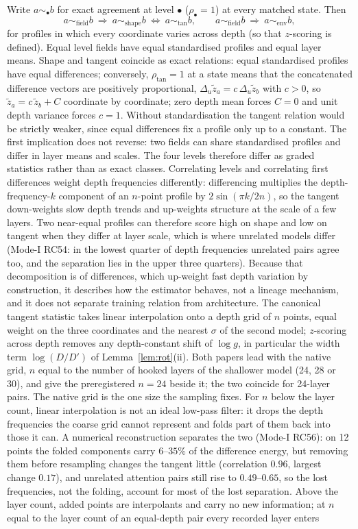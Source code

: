 \documentclass[11pt]{article}
\theoremstyle{definition}
\begin{document}
Write $a\sim_\bullet b$ for exact agreement at level $\bullet$ ($\rho_\bullet=1$) at every matched state. Then
\[
 a\sim_{\mathrm{field}} b\ \Rightarrow\ a\sim_{\mathrm{shape}} b\ \Longleftrightarrow\ a\sim_{\mathrm{tan}}b,\qquad a\sim_{\mathrm{field}}b\ \Rightarrow\ a\sim_{\mathrm{env}}b,
\]
for profiles in which every coordinate varies across depth (so that $z$-scoring is defined). Equal level fields have equal standardised profiles and equal layer means. Shape and tangent coincide as exact relations: equal standardised profiles have equal differences; conversely, $\rho_{\mathrm{tan}}=1$ at a state means that the concatenated difference vectors are positively proportional, $\Delta_u\tilde z_a=c\,\Delta_u\tilde z_b$ with $c>0$, so $\tilde z_a=c\,\tilde z_b+C$ coordinate by coordinate; zero depth mean forces $C=0$ and unit depth variance forces $c=1$. Without standardisation the tangent relation would be strictly weaker, since equal differences fix a profile only up to a constant. The first implication does not reverse: two fields can share standardised profiles and differ in layer means and scales. The four levels therefore differ as graded statistics rather than as exact classes. Correlating levels and correlating first differences weight depth frequencies differently: differencing multiplies the depth-frequency-$k$ component of an $n$-point profile by $2\sin(\pi k/2n)$, so the tangent down-weights slow depth trends and up-weights structure at the scale of a few layers. Two near-equal profiles can therefore score high on shape and low on tangent when they differ at layer scale, which is where unrelated models differ (Mode-I RC54: in the lowest quarter of depth frequencies unrelated pairs agree too, and the separation lies in the upper three quarters). Because that decomposition is of differences, which up-weight fast depth variation by construction, it describes how the estimator behaves, not a lineage mechanism, and it does not separate training relation from architecture. The canonical tangent statistic takes linear interpolation onto a depth grid of $n$ points, equal weight on the three coordinates and the nearest $\sigma$ of the second model; $z$-scoring across depth removes any depth-constant shift of $\log g$, in particular the width term $\log(D/D')$ of Lemma~\ref{lem:rot}(ii). Both papers lead with the native grid, $n$ equal to the number of hooked layers of the shallower model (24, 28 or 30), and give the preregistered $n=24$ beside it; the two coincide for 24-layer pairs. The native grid is the one size the sampling fixes. For $n$ below the layer count, linear interpolation is not an ideal low-pass filter: it drops the depth frequencies the coarse grid cannot represent and folds part of them back into those it can. A numerical reconstruction separates the two (Mode-I RC56): on 12 points the folded components carry $6$--$35\%$ of the difference energy, but removing them before resampling changes the tangent little (correlation $0.96$, largest change $0.17$), and unrelated attention pairs still rise to $0.49$--$0.65$, so the lost frequencies, not the folding, account for most of the lost separation. Above the layer count, added points are interpolants and carry no new information; at $n$ equal to the layer count of an equal-depth pair every recorded layer enters 
\end{document}
